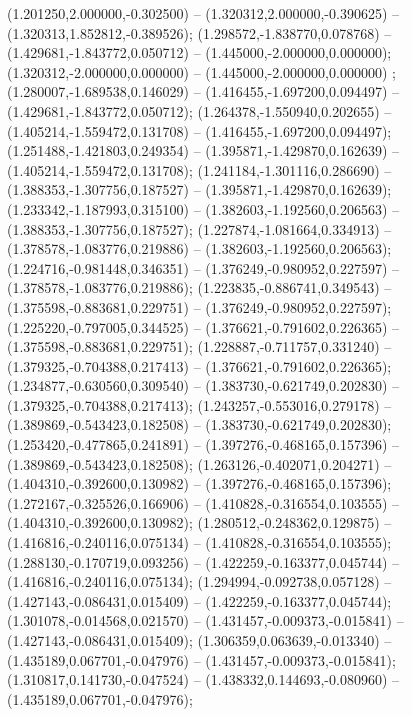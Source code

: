  (1.201250,2.000000,-0.302500) -- (1.320312,2.000000,-0.390625) -- (1.320313,1.852812,-0.389526);
 (1.298572,-1.838770,0.078768) -- (1.429681,-1.843772,0.050712) -- (1.445000,-2.000000,0.000000);
 (1.320312,-2.000000,0.000000) -- (1.445000,-2.000000,0.000000) ;
 (1.280007,-1.689538,0.146029) -- (1.416455,-1.697200,0.094497) -- (1.429681,-1.843772,0.050712);
 (1.264378,-1.550940,0.202655) -- (1.405214,-1.559472,0.131708) -- (1.416455,-1.697200,0.094497);
 (1.251488,-1.421803,0.249354) -- (1.395871,-1.429870,0.162639) -- (1.405214,-1.559472,0.131708);
 (1.241184,-1.301116,0.286690) -- (1.388353,-1.307756,0.187527) -- (1.395871,-1.429870,0.162639);
 (1.233342,-1.187993,0.315100) -- (1.382603,-1.192560,0.206563) -- (1.388353,-1.307756,0.187527);
 (1.227874,-1.081664,0.334913) -- (1.378578,-1.083776,0.219886) -- (1.382603,-1.192560,0.206563);
 (1.224716,-0.981448,0.346351) -- (1.376249,-0.980952,0.227597) -- (1.378578,-1.083776,0.219886);
 (1.223835,-0.886741,0.349543) -- (1.375598,-0.883681,0.229751) -- (1.376249,-0.980952,0.227597);
 (1.225220,-0.797005,0.344525) -- (1.376621,-0.791602,0.226365) -- (1.375598,-0.883681,0.229751);
 (1.228887,-0.711757,0.331240) -- (1.379325,-0.704388,0.217413) -- (1.376621,-0.791602,0.226365);
 (1.234877,-0.630560,0.309540) -- (1.383730,-0.621749,0.202830) -- (1.379325,-0.704388,0.217413);
 (1.243257,-0.553016,0.279178) -- (1.389869,-0.543423,0.182508) -- (1.383730,-0.621749,0.202830);
 (1.253420,-0.477865,0.241891) -- (1.397276,-0.468165,0.157396) -- (1.389869,-0.543423,0.182508);
 (1.263126,-0.402071,0.204271) -- (1.404310,-0.392600,0.130982) -- (1.397276,-0.468165,0.157396);
 (1.272167,-0.325526,0.166906) -- (1.410828,-0.316554,0.103555) -- (1.404310,-0.392600,0.130982);
 (1.280512,-0.248362,0.129875) -- (1.416816,-0.240116,0.075134) -- (1.410828,-0.316554,0.103555);
 (1.288130,-0.170719,0.093256) -- (1.422259,-0.163377,0.045744) -- (1.416816,-0.240116,0.075134);
 (1.294994,-0.092738,0.057128) -- (1.427143,-0.086431,0.015409) -- (1.422259,-0.163377,0.045744);
 (1.301078,-0.014568,0.021570) -- (1.431457,-0.009373,-0.015841) -- (1.427143,-0.086431,0.015409);
 (1.306359,0.063639,-0.013340) -- (1.435189,0.067701,-0.047976) -- (1.431457,-0.009373,-0.015841);
 (1.310817,0.141730,-0.047524) -- (1.438332,0.144693,-0.080960) -- (1.435189,0.067701,-0.047976);
